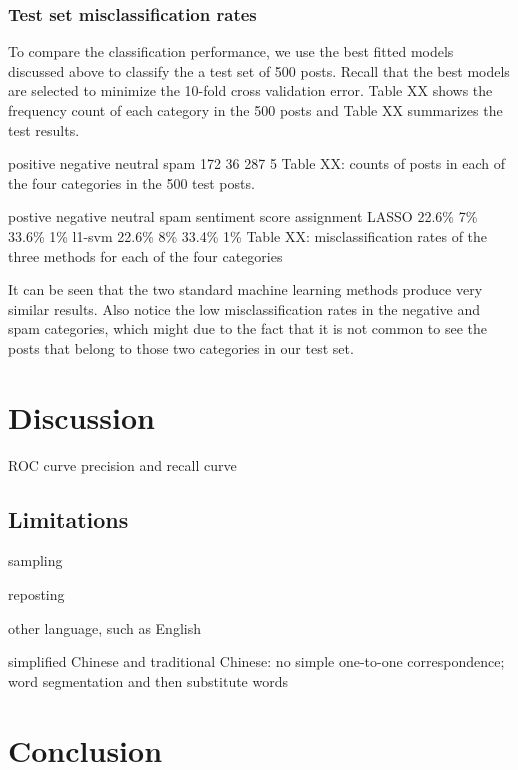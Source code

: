 \documentclass[11pt]{article}
\newcommand{\1}[1]{{\mathbf 1}\left\{#1\right\}}        %
\begin{document}
\subsubsection{Test set misclassification rates}
To compare the classification performance, we use the best fitted models discussed above to classify the a test set of 500 posts. Recall that the best models are selected to minimize the 10-fold cross validation error. Table XX shows the frequency count of each category in the 500 posts and Table XX summarizes the test results. 


positive negative neutral spam
 172       36      287     5
Table XX: counts of posts in each of the four categories in the 500 test posts.

                postive  negative   neutral      spam
sentiment score
assignment
LASSO               22.6\%      7\%      33.6\%        1\%
l1-svm              22.6\%      8\%      33.4\%        1\%
Table XX: misclassification rates of the three methods for each of the four categories

It can be seen that the two standard machine learning methods produce very similar results. Also notice the low misclassification rates in the negative and spam categories, which might due to the fact that it is not common to see the posts that belong to those two categories in our test set.
\section{Discussion}

ROC curve
precision and recall curve

\subsection{Limitations}

sampling \cite{boyd2004fastest} \cite{leskovec2006sampling}  \cite{wang2011understanding}

reposting

other language, such as English

simplified Chinese and traditional Chinese: no simple one-to-one correspondence; word segmentation and then substitute words



\section{Conclusion}
\end{document}
